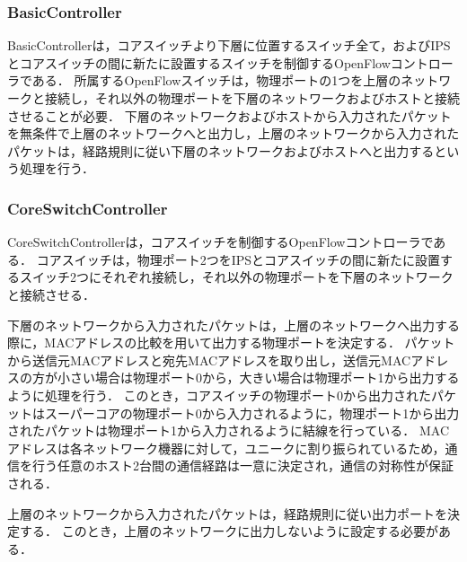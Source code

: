 \subsubsection{BasicController}

BasicControllerは，コアスイッチより下層に位置するスイッチ全て，およびIPSとコアスイッチの間に新たに設置するスイッチを制御するOpenFlowコントローラである．
所属するOpenFlowスイッチは，物理ポートの1つを上層のネットワークと接続し，それ以外の物理ポートを下層のネットワークおよびホストと接続させることが必要．
下層のネットワークおよびホストから入力されたパケットを無条件で上層のネットワークへと出力し，上層のネットワークから入力されたパケットは，経路規則に従い下層のネットワークおよびホストへと出力するという処理を行う．

\subsubsection{CoreSwitchController}

CoreSwitchControllerは，コアスイッチを制御するOpenFlowコントローラである．
コアスイッチは，物理ポート2つをIPSとコアスイッチの間に新たに設置するスイッチ2つにそれぞれ接続し，それ以外の物理ポートを下層のネットワークと接続させる．

下層のネットワークから入力されたパケットは，上層のネットワークへ出力する際に，MACアドレスの比較を用いて出力する物理ポートを決定する．
パケットから送信元MACアドレスと宛先MACアドレスを取り出し，送信元MACアドレスの方が小さい場合は物理ポート0から，大きい場合は物理ポート1から出力するように処理を行う．
このとき，コアスイッチの物理ポート0から出力されたパケットはスーパーコアの物理ポート0から入力されるように，物理ポート1から出力されたパケットは物理ポート1から入力されるように結線を行っている．
MACアドレスは各ネットワーク機器に対して，ユニークに割り振られているため，通信を行う任意のホスト2台間の通信経路は一意に決定され，通信の対称性が保証される．

上層のネットワークから入力されたパケットは，経路規則に従い出力ポートを決定する．
このとき，上層のネットワークに出力しないように設定する必要がある．